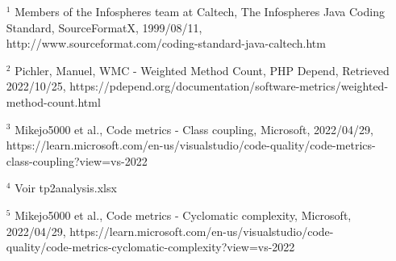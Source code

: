 \documentclass{article}
\begin{document}
\vspace*{\fill}
\begin{enumerate}
\item[$^1$]
\footnotesize Members of the Infospheres team at Caltech, The Infospheres Java Coding Standard, SourceFormatX, 1999/08/11, http://www.sourceformat.com/coding-standard-java-caltech.htm
\item[$^2$]
\footnotesize Pichler, Manuel, WMC - Weighted Method Count, PHP Depend, Retrieved 2022/10/25, https://pdepend.org/documentation/software-metrics/weighted-method-count.html
\item[$^3$]
\footnotesize Mikejo5000 et al., Code metrics - Class coupling, Microsoft, 2022/04/29, https://learn.microsoft.com/en-us/visualstudio/code-quality/code-metrics-class-coupling?view=vs-2022
\item[$^4$]
\footnotesize Voir tp2analysis.xlsx
\item[$^5$]
\footnotesize Mikejo5000 et al., Code metrics - Cyclomatic complexity, Microsoft, 2022/04/29, https://learn.microsoft.com/en-us/visualstudio/code-quality/code-metrics-cyclomatic-complexity?view=vs-2022

\end{enumerate}
\end{document}

